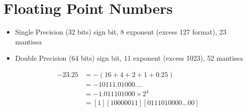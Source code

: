 \section{Floating Point Numbers}
\begin{itemize}
	\item Single Precision (32 bits)
	 sign bit, 8 exponent (excess 127 format), 23 mantissa
	\item Double Precision (64 bits)
	 sign bit, 11 exponent (excess 1023), 52 mantissa	
\end{itemize}
\begin{align*}
	-23.25 &= -(16 + 4 + 2 + 1 + 0.25)\\
	&= -10111.01000....\\
	&= -1.011101000\times2^4\\
	&= [1][10000011][0111010000...00]	
\end{align*}
